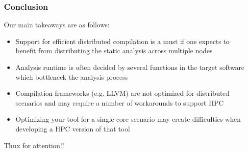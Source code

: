 \begin{frame}
\frametitle{Conclusion}
Our main takeaways are as follows:
	\begin{itemize}
		\item Support for efficient distributed compilation is a must if one expects to benefit from distributing the static analysis across multiple nodes
		\item Analysis runtime is often decided by several functions in the target software which bottleneck the analysis process
		\item Compilation frameworks (e.g. LLVM) are not optimized for distributed scenarios and may require a number of workarounds to support HPC
		\item Optimizing your tool for a single-core scenario may create difficulties when developing a HPC version of that tool 
	\end{itemize}
\end{frame}

\begin{frame}
Thnx for attention!!
\end{frame}